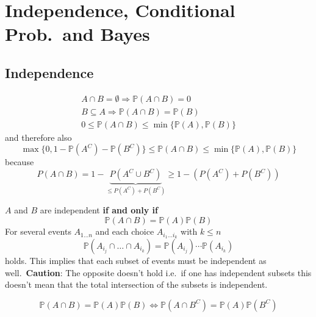 \section{Independence, Conditional Prob.\ and Bayes}
\subsection{Independence}

\noindent\begin{gather*}
    A \cap B = \emptyset \Rightarrow \mathbb{P}(A\cap B) = 0 \\
    B \subseteq A \Rightarrow \mathbb{P}(A\cap B) = \mathbb{P}(B) \\
    0 \leq \mathbb{P}(A\cap B) \leq \min\{\mathbb{P}(A), \mathbb{P}(B)\}
\end{gather*}
and therefore also
\begin{equation*}
    \max\{0, 1-\mathbb{P}(A^C) -\mathbb{P}(B^C)\} \leq \mathbb{P}(A\cap B) \leq \min\{ \mathbb{P}(A), \mathbb{P}(B)\}
\end{equation*}
because
\begin{equation*}
    P(A\cap B)=1-\underbrace{P(A^C \cup B^C)}_{\le P(A^C)+P(B^C)}\ge 1-(P(A^C)+P(B^C))
\end{equation*}


$A$ and $B$ are independent \textbf{if and only if}
\noindent\begin{equation*}
    \mathbb{P}(A\cap B) = \mathbb{P}(A)\mathbb{P}(B)
\end{equation*}
For several events $A_{1\dots n}$ and each choice $A_{i_1\dots i_k}$ with $k\leq n$
\noindent\begin{equation*}
    \mathbb{P}(A_{i_j} \cap \dots \cap A_{i_k}) = \mathbb{P}(A_{i_j}) \cdots \mathbb{P}(A_{i_k})
\end{equation*}
holds. This implies that each subset of events must be independent as well.\ \textbf{Caution}: The opposite doesn't hold i.e.\ if one has independent subsets this doesn't mean that the total intersection of the subsets is independent.


\noindent\begin{equation*}
    \mathbb{P}(A\cap B) = \mathbb{P}(A)\mathbb{P}(B) \Leftrightarrow \mathbb{P}(A\cap B^C) = \mathbb{P}(A)\mathbb{P}(B^C)
\end{equation*}

